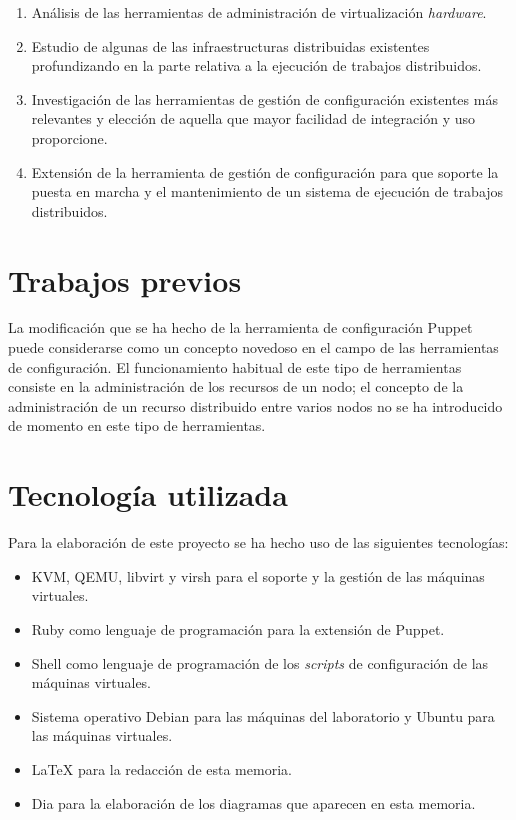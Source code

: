 \begin{enumerate}
\item Análisis de las herramientas de administración de virtualización \emph{hardware}.
\item Estudio de algunas de las infraestructuras distribuidas existentes profundizando en la parte relativa a la ejecución de trabajos distribuidos.
\item Investigación de las herramientas de gestión de configuración existentes más relevantes y elección de aquella que mayor facilidad de integración y uso proporcione.
\item Extensión de la herramienta de gestión de configuración para que soporte la puesta en marcha y el mantenimiento de un sistema de ejecución de trabajos distribuidos.
\end{enumerate}


\section{Trabajos previos}

La modificación que se ha hecho de la herramienta de configuración Puppet puede considerarse como un concepto novedoso en el campo de las herramientas de configuración. El funcionamiento habitual de este tipo de herramientas consiste en la administración de los recursos de un nodo; el concepto de la administración de un recurso distribuido entre varios nodos no se ha introducido de momento en este tipo de herramientas.


\section{Tecnología utilizada}

Para la elaboración de este proyecto se ha hecho uso de las siguientes tecnologías:
\begin{itemize}
\item KVM, QEMU, libvirt y virsh para el soporte y la gestión de las máquinas virtuales.
\item Ruby como lenguaje de programación para la extensión de Puppet.
\item Shell como lenguaje de programación de los \emph{scripts} de configuración de las máquinas virtuales.
\item Sistema operativo Debian para las máquinas del laboratorio y Ubuntu para las máquinas virtuales.
\item \LaTeX{} \cite{manual:latex} para la redacción de esta memoria.
\item Dia para la elaboración de los diagramas que aparecen en esta memoria.
\end{itemize}


